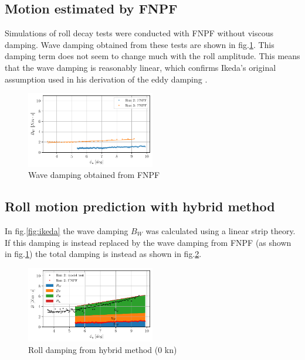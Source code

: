 \subsection*{Motion estimated by FNPF}\label{fnpf}

Simulations of roll decay tests were conducted with FNPF without viscous
damping. Wave damping obtained from these tests are shown in
fig.\ref{fig:fnpf}. This damping term does not seem to change
much with the roll amplitude. This means that the wave damping is
reasonably linear, which confirms Ikeda's original assumption used in
his derivation of the eddy damping \cite{7505983/4AFVVGNT}.

    

    \begin{figure}[H]
        \begin{center}\includegraphics[width = 0.5\textwidth]{figures/fnpf.pdf}\end{center}
        \vspace{-1cm}
        \caption{Wave damping obtained from FNPF}
        \label{fig:fnpf}
    \end{figure}
    
    \subsection*{Roll motion prediction with hybrid
method}\label{roll-motion-prediction-with-hybrid-method}

    In fig.\ref{fig:ikeda} the wave damping $B_W$ was calculated
using a linear strip theory. If this damping is instead replaced by the
wave damping from FNPF (as shown in fig.\ref{fig:fnpf}) the
total damping is instead as shown in fig.\ref{fig:hybrid_0}.

    

    \begin{figure}[H]
        \begin{center}\includegraphics[width = 0.5\textwidth]{figures/hybrid_0.pdf}\end{center}
        \vspace{-1cm}
        \caption{Roll damping from hybrid method (0 kn)}
        \label{fig:hybrid_0}
    \end{figure}
    
